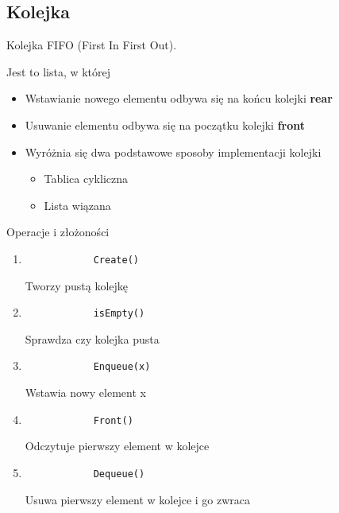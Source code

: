 \documentclass[main.tex]{subfiles}
\begin{document}
    \subsection{Kolejka}
    \begin{definition}
        Kolejka FIFO (First In First Out).

        Jest to lista, w której
        \begin{itemize}
            \item Wstawianie nowego elementu odbywa się na końcu kolejki \textbf{rear}
            \item Usuwanie elementu odbywa się na początku kolejki \textbf{front}\\
            \item Wyróżnia się dwa podstawowe sposoby implementacji kolejki
            \begin{itemize}
                \item Tablica cykliczna
                \item Lista wiązana
            \end{itemize}
        \end{itemize}
    \end{definition}

    Operacje i złożoności
    \begin{enumerate}
        \item
        \begin{verbatim}
            Create()
        \end{verbatim}
        Tworzy pustą kolejkę
        \item
        \begin{verbatim}
            isEmpty()
        \end{verbatim}
        Sprawdza czy kolejka pusta
        \item
        \begin{verbatim}
            Enqueue(x)
        \end{verbatim}
        Wstawia nowy element x
        \item
        \begin{verbatim}
            Front()
        \end{verbatim}
        Odczytuje pierwszy element w kolejce
        \item
        \begin{verbatim}
            Dequeue()
        \end{verbatim}
        Usuwa pierwszy element w kolejce i go zwraca
    \end{enumerate}
\end{document}
